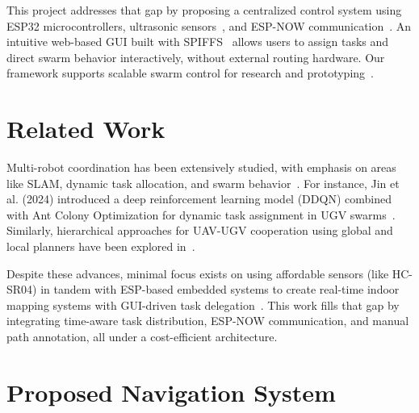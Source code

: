 \documentclass[conference]{IEEEtran}
\begin{document}
\noindent This project addresses that gap by proposing a centralized control system using ESP32 microcontrollers, ultrasonic sensors~\cite{arduino_hcsr04}, and ESP-NOW communication~\cite{espnowguide}. An intuitive web-based GUI built with SPIFFS~\cite{randomnerd2024esp32} allows users to assign tasks and direct swarm behavior interactively, without external routing hardware. Our framework supports scalable swarm control for research and prototyping~\cite{jin2024multi, mdpi2022hierarchical}.
\section{Related Work}
\label{sec:related-work}

Multi-robot coordination has been extensively studied, with emphasis on areas like SLAM, dynamic task allocation, and swarm behavior~\cite{brambilla2013swarm, kalra2005hoplite}. For instance, Jin et al. (2024) introduced a deep reinforcement learning model (DDQN) combined with Ant Colony Optimization for dynamic task assignment in UGV swarms~\cite{jin2024multi}. Similarly, hierarchical approaches for UAV-UGV cooperation using global and local planners have been explored in~\cite{mdpi2022hierarchical}.

Despite these advances, minimal focus exists on using affordable sensors (like HC-SR04) in tandem with ESP-based embedded systems to create real-time indoor mapping systems with GUI-driven task delegation~\cite{arduino_hcsr04, espnowguide, randomnerd2024esp32}. This work fills that gap by integrating time-aware task distribution, ESP-NOW communication, and manual path annotation, all under a cost-efficient architecture.
\section{Proposed Navigation System}
\label{sec:proposed-system}
\end{document}
